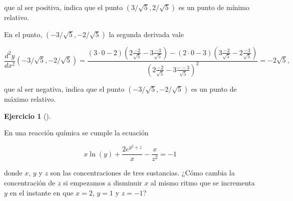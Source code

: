 \documentclass[
  a4paper,
]{scrreport}
\theoremstyle{definition}
\newtheorem{exercise}{Ejercicio}[chapter]
\theoremstyle{remark}
\begin{document}
\begin{tcolorbox}
que al ser positiva, indica que el punto \((3/\sqrt{5},2/\sqrt{5})\) es
un punto de mínimo relativo.

En el punto, \((-3/\sqrt{5},-2/\sqrt{5})\) la segunda derivada vale

\[
\frac{d^{2}y}{dx^{2}}(-3/\sqrt{5},-2/\sqrt{5})=
\frac{(3\cdot 0-2)(2\frac{-2}{\sqrt{5}}-3\frac{-3}{\sqrt{5}})-(2\cdot 0-3)(3\frac{-2}{\sqrt{5}}-2\frac{-3}{\sqrt{5}})}{(2\frac{-2}{\sqrt{5}}-3\frac{--3}{\sqrt{5}})^{2}} = -2\sqrt{5},
\]

que al ser negativa, indica que el punto \((-3/\sqrt{5},-2/\sqrt{5})\)
es un punto de máximo relativo.

\end{tcolorbox}

\begin{exercise}[]\protect\hypertarget{exr-derivada-implicita-direccional}{}\label{exr-derivada-implicita-direccional}

En una reacción química se cumple la ecuación

\[
x\ln(y)+\frac{2e^{y^2+z}}{x} - \frac{x}{z^2} = -1
\]

donde \(x\), \(y\) y \(z\) son las concentraciones de tres sustancias.
¿Cómo cambia la concentración de \(z\) si empezamos a disminuir \(x\) al
mismo ritmo que se incrementa \(y\) en el instante en que \(x=2\),
\(y=1\) y \(z=-1\)?

\end{exercise}
\end{document}

